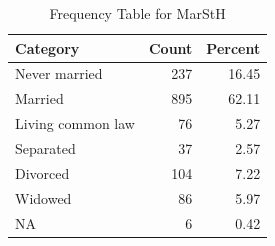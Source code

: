 \begin{table}[!h]
\centering
\caption{\label{tab:tab:MarStH}Frequency Table for MarStH}
\centering
\begin{tabular}[t]{lrr}
\toprule
Category & Count & Percent\\
\midrule
Never married & 237 & 16.45\\
Married & 895 & 62.11\\
Living common law & 76 & 5.27\\
Separated & 37 & 2.57\\
Divorced & 104 & 7.22\\
\addlinespace
Widowed & 86 & 5.97\\
NA & 6 & 0.42\\
\bottomrule
\end{tabular}
\end{table}

